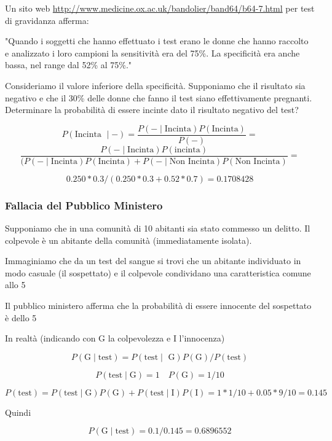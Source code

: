 \documentclass[onecolumn,12pt]{book}\usepackage[]{graphicx}\usepackage[]{color}
\begin{document}
Un sito web \url{http://www.medicine.ox.ac.uk/bandolier/band64/b64-7.html} per test di gravidanza afferma:  


"Quando i soggetti che hanno effettuato i test erano le donne che hanno raccolto e analizzato i loro campioni la sensitività  era del 75\%. La specificità era anche bassa, nel range dal 52\% al 75\%." 

Consideriamo il valore inferiore della specificità.  Supponiamo che il risultato sia negativo e che il 30\%  delle donne che fanno il test  siano effettivamente pregnanti. Determinare la probabilità di essere incinte dato il risultato negativo del test?

$$P (\textrm{Incinta }\mid -) = \dfrac{P (-\mid \textrm{Incinta}) P (\textrm{Incinta})}{P (-)} =$$
$$\dfrac{ P (-\mid \textrm{Incinta}) P (\textrm{incinta})}{(P (-\mid \textrm{Incinta}) P (\textrm{Incinta}) + P (-\mid \textrm{Non Incinta}) P (\textrm{Non Incinta})}=$$

$$0.250*0.3 /(0.250*0.3 + 0.52*0.7)=0.1708428$$



\subsubsection{Fallacia del Pubblico Ministero}


Supponiamo  che in una comunità di 10 abitanti sia stato commesso un delitto. Il colpevole è un abitante della comunità (immediatamente isolata).


Immaginiamo che da un test del sangue si trovi che un abitante individuato in modo casuale  (il sospettato) e il colpevole condividano una caratteristica comune allo 5%

Il pubblico ministero afferma che la probabilità di essere innocente del sospettato è dello 5%


In realtà (indicando con G la colpevolezza e I l'innocenza)

$$P (\textrm{G}\mid\textrm{test}) 
= P (\textrm{test}\mid\textrm{ G})P (\textrm{G})/P (\textrm{test})$$
        
$$P (\textrm{test} \mid \textrm{G}) = 1\quad 
P (\textrm{G}) = 1/10$$
        
$$P (\textrm{test}) = P(\textrm{test}\mid  \textrm{G}) P(\textrm{G}) +
P(\textrm{test}\mid\textrm{I})P(\textrm{I}) =
1*1/10 + 0.05 *9/10 = 0.145$$
        
Quindi

$$P (\textrm{G}\mid\textrm{test}) = 0.1/0.145=
        0.6896552$$
        
\end{document}
